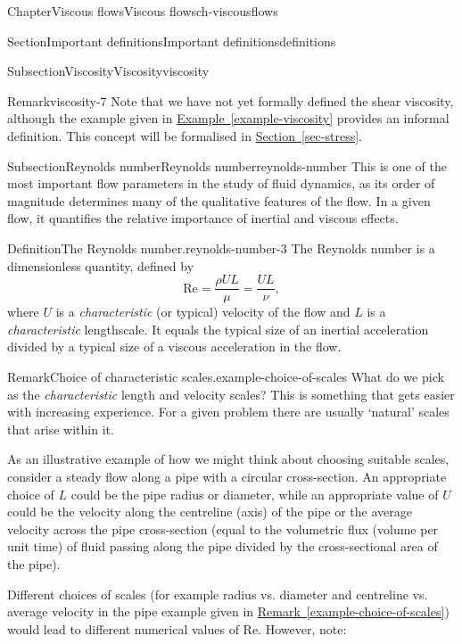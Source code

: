 \documentclass[oneside,10pt,]{book}
\newcommand{\xreffont}{\relax}
\numberwithin{equation}{section}
\begin{document}
\begin{chapterptx}{Chapter}{Viscous flows}{}{Viscous flows}{}{}{ch-viscousflows}
\begin{sectionptx}{Section}{Important definitions}{}{Important definitions}{}{}{definitions}
\begin{subsectionptx}{Subsection}{Viscosity}{}{Viscosity}{}{}{viscosity}
\begin{remark}{Remark}{}{viscosity-7}
Note that we have not yet formally defined the shear viscosity, although the example given in \hyperref[example-viscosity]{Example~{\xreffont\ref{example-viscosity}}} provides an informal definition. This concept will be formalised in \hyperref[sec-stress]{Section~{\xreffont\ref{sec-stress}}}.%
\end{remark}
\end{subsectionptx}
%
%
\typeout{************************************************}
\typeout{************************************************}
%
\begin{subsectionptx}{Subsection}{Reynolds number}{}{Reynolds number}{}{}{reynolds-number}
This is one of the most important flow parameters in the study of fluid dynamics, as its order of magnitude determines many of the qualitative features of the flow. In a given flow, it quantifies the relative importance of inertial and viscous effects.%
\begin{definition}{Definition}{The Reynolds number.}{reynolds-number-3}%
The Reynolds number is a dimensionless quantity, defined by%
\begin{equation*}
\textrm{Re} = \frac{\rho U L}{\mu} = \frac{U L}{\nu},
\end{equation*}
where \(U\) is a \emph{characteristic} (or typical) velocity of the flow and \(L\) is a \emph{characteristic} lengthscale. It equals the typical size of an inertial acceleration divided by a typical size of a viscous acceleration in the flow.%
\end{definition}
\begin{remark}{Remark}{Choice of characteristic scales.}{example-choice-of-scales}%
What do we pick as the \emph{characteristic} length and velocity scales? This is something that gets easier with increasing experience. For a given problem there are usually ‘natural’ scales that arise within it.%
\par
As an illustrative example of how we might think about choosing suitable scales, consider a steady flow along a pipe with a circular cross-section. An appropriate choice of \(L\) could be the pipe radius or diameter, while an appropriate value of \(U\) could be the velocity along the centreline (axis) of the pipe or the average velocity across the pipe cross-section (equal to the volumetric flux (volume per unit time) of fluid passing along the pipe divided by the cross-sectional area of the pipe).%
\par
Different choices of scales (for example radius vs. diameter and centreline vs. average velocity in the pipe example given in \hyperref[example-choice-of-scales]{Remark~{\xreffont\ref{example-choice-of-scales}}}) would lead to different numerical values of \(\textrm{Re}\). However, note:%

\end{remark}
\end{subsectionptx}
\end{sectionptx}
\end{chapterptx}
\end{document}
